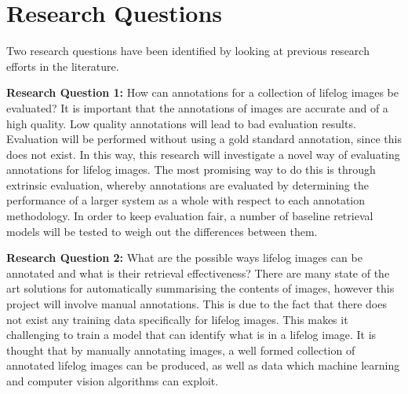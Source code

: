 \section{Research Questions}

Two research questions have been identified by looking at previous research efforts in the literature. 

\textbf{Research Question 1:} How can annotations for a collection of lifelog images be evaluated? It is important that the annotations of images are accurate and of a high quality. Low quality annotations will lead to bad evaluation results. Evaluation will be performed without using a gold standard annotation, since this does not exist. In this way, this research will investigate a novel way of evaluating annotations for lifelog images. The most promising way to do this is through extrinsic evaluation, whereby annotations are evaluated by determining the performance of a larger system as a whole with respect to each annotation methodology. In order to keep evaluation fair, a number of baseline retrieval models will be tested to weigh out the differences between them.

\textbf{Research Question 2:} What are the possible ways lifelog images can be annotated and what is their retrieval effectiveness? There are many state of the art solutions for automatically summarising the contents of images, however this project will involve manual annotations. This is due to the fact that there does not exist any training data specifically for lifelog images. This makes it challenging to train a model that can identify what is in a lifelog image. It is thought that by manually annotating images, a well formed collection of annotated lifelog images can be produced, as well as data which machine learning and computer vision algorithms can exploit.
